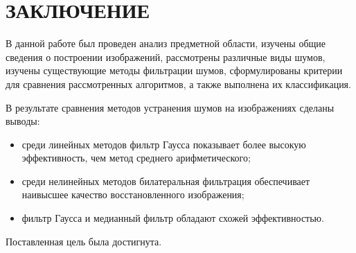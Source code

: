\chapter*{ЗАКЛЮЧЕНИЕ}

В данной работе был проведен анализ предметной области, изучены общие сведения о построении изображений, рассмотрены различные виды шумов, изучены существующие методы фильтрации шумов, сформулированы критерии для сравнения рассмотренных алгоритмов, а также выполнена их классификация.

В результате сравнения методов устранения шумов на изображениях сделаны выводы:
\begin{itemize}
    \item среди линейных методов фильтр Гаусса показывает более высокую эффективность, чем метод среднего арифметического;
    \item среди нелинейных методов билатеральная фильтрация обеспечивает наивысшее качество восстановленного изображения;
    \item фильтр Гаусса и медианный фильтр обладают схожей эффективностью.
\end{itemize}

Поставленная цель была достигнута.